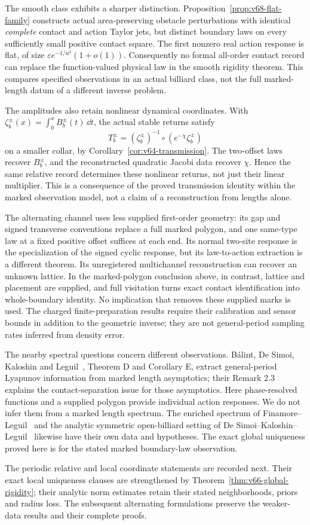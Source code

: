 The smooth class exhibits a sharper distinction.  Proposition~\ref{prop:v68-flat-family}
constructs actual area-preserving obstacle perturbations with identical
\emph{complete} contact and action Taylor jets, but distinct boundary
laws on every sufficiently small positive contact square.  The first
nonzero real action response is flat, of size
$\varepsilon e^{-1/u^2}(1+o(1))$.  Consequently no formal all-order
contact record can replace the function-valued physical law in the smooth
rigidity theorem.  This compares specified observations in an actual
billiard class, not the full marked-length datum of a different inverse
problem.

The amplitudes also retain nonlinear dynamical coordinates.  With
$\zeta_b^\pm(x)=\int_0^x B_b^\pm(t)\,\dd t$, the actual stable
returns satisfy
\[
 T_b^\pm=(\zeta_b^\pm)^{-1}\circ
                (e^{-\chi}\zeta_b^\pm)
\]
on a smaller collar, by Corollary~\ref{cor:v64-transmission}.
The two-offset laws recover $B_b^\pm$, and the reconstructed quadratic
Jacobi data recover $\chi$.  Hence the same relative record determines
these nonlinear returns, not just their linear multiplier.  This is
a consequence of the proved transmission identity within the marked
observation model, not a claim of a reconstruction from lengths alone.

The alternating channel uses less supplied first-order geometry: its gap
and signed transverse conventions replace a full marked polygon, and one
same-type law at a fixed positive offset suffices at each end.  Its
normal two-site response is the specialization of the signed cyclic
response, but its law-to-action extraction is a different theorem.  Its
unregistered multichannel reconstruction can recover an unknown lattice.
In the marked-polygon conclusion above, in contrast, lattice and placement
are supplied, and full visitation turns exact contact identification into
whole-boundary identity.  No implication that removes these supplied
marks is used.  The charged finite-preparation results require their
calibration and sensor bounds in addition to the geometric inverse;
they are not general-period sampling rates inferred from density error.

The nearby spectral questions concern different observations.
B\'alint, De Simoi, Kaloshin and Leguil~\cite{BDKL}, Theorem D and
Corollary E, extract general-period Lyapunov information from marked
length asymptotics; their Remark 2.3 explains the contact-separation
issue for those asymptotics.  Here phase-resolved functions and a supplied
polygon provide individual action responses.  We do not infer them from
a marked length spectrum.  The enriched spectrum of
Finamore--Leguil~\cite{FinamoreLeguil} and the analytic symmetric
open-billiard setting of De Simoi--Kaloshin--Leguil~\cite{DSKL} likewise
have their own data and hypotheses.  The exact global uniqueness proved
here is for the stated marked boundary-law observation.

The periodic relative and local coordinate statements are recorded next.
Their exact local uniqueness clauses are strengthened by
Theorem~\ref{thm:v66-global-rigidity}; their analytic norm estimates retain
their stated neighborhoods, priors and radius loss.  The subsequent
alternating formulations preserve the weaker-data results and their
complete proofs.
